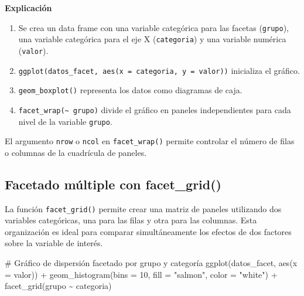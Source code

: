 \documentclass[
  spanish,
  a4paper,
  DIV=11,
  numbers=noendperiod,
  onepage,
  openany]{scrreprt}
\newenvironment{Shaded}{\begin{snugshade}}{\end{snugshade}}
\newcommand{\AttributeTok}[1]{\textcolor[rgb]{0.40,0.45,0.13}{#1}}
\newcommand{\CommentTok}[1]{\textcolor[rgb]{0.37,0.37,0.37}{#1}}
\newcommand{\DecValTok}[1]{\textcolor[rgb]{0.68,0.00,0.00}{#1}}
\newcommand{\FunctionTok}[1]{\textcolor[rgb]{0.28,0.35,0.67}{#1}}
\newcommand{\NormalTok}[1]{\textcolor[rgb]{0.00,0.23,0.31}{#1}}
\newcommand{\SpecialCharTok}[1]{\textcolor[rgb]{0.37,0.37,0.37}{#1}}
\newcommand{\StringTok}[1]{\textcolor[rgb]{0.13,0.47,0.30}{#1}}
\begin{document}
\textbf{Explicación}

\begin{enumerate}
\def\labelenumi{\arabic{enumi}.}
\item
  Se crea un data frame con una variable categórica para las facetas
  (\texttt{grupo}), una variable categórica para el eje X
  (\texttt{categoria}) y una variable numérica (\texttt{valor}).
\item
  \texttt{ggplot(datos\_facet,\ aes(x\ =\ categoria,\ y\ =\ valor))}
  inicializa el gráfico.
\item
  \texttt{geom\_boxplot()} representa los datos como diagramas de caja.
\item
  \texttt{facet\_wrap(\textasciitilde{}\ grupo)} divide el gráfico en
  paneles independientes para cada nivel de la variable \texttt{grupo}.
\end{enumerate}

El argumento \texttt{nrow} o \texttt{ncol} en \texttt{facet\_wrap()}
permite controlar el número de filas o columnas de la cuadrícula de
paneles.

\subsection{Facetado múltiple con
facet\_grid()}\label{facetado-muxfaltiple-con-facet_grid}

La función \texttt{facet\_grid()} permite crear una matriz de paneles
utilizando dos variables categóricas, una para las filas y otra para las
columnas. Esta organización es ideal para comparar simultáneamente los
efectos de dos factores sobre la variable de interés.

\begin{Shaded}
\begin{Highlighting}[]
\CommentTok{\# Gráfico de dispersión facetado por grupo y categoría}
\FunctionTok{ggplot}\NormalTok{(datos\_facet, }\FunctionTok{aes}\NormalTok{(}\AttributeTok{x =}\NormalTok{ valor)) }\SpecialCharTok{+}
  \FunctionTok{geom\_histogram}\NormalTok{(}\AttributeTok{bins =} \DecValTok{10}\NormalTok{, }\AttributeTok{fill =} \StringTok{"salmon"}\NormalTok{, }\AttributeTok{color =} \StringTok{"white"}\NormalTok{) }\SpecialCharTok{+}
  \FunctionTok{facet\_grid}\NormalTok{(grupo }\SpecialCharTok{\textasciitilde{}}\NormalTok{ categoria)}
\end{Highlighting}
\end{Shaded}
\end{document}
